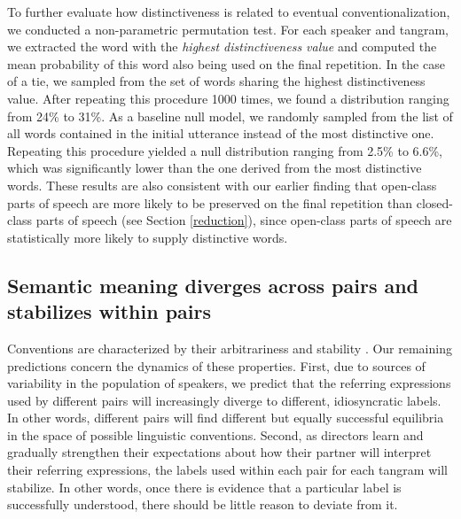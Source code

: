 \documentclass[alpha-refs]{wiley-article}
\begin{document}
To further evaluate how distinctiveness is related to eventual conventionalization, we conducted a non-parametric permutation test.
For each speaker and tangram, we extracted the word with the \emph{highest distinctiveness value} and computed the mean probability of this word also being used on the final repetition. 
In the case of a tie, we sampled from the set of words sharing the highest distinctiveness value.
After repeating this procedure 1000 times, we found a distribution ranging from 24\% to 31\%.
As a baseline null model, we randomly sampled from the list of all words contained in the initial utterance instead of the most distinctive one.
Repeating this procedure yielded a null distribution ranging from 2.5\% to 6.6\%, which was significantly lower than the one derived from the most distinctive words.
These results are also consistent with our earlier finding that open-class parts of speech are more likely to be preserved on the final repetition than closed-class parts of speech (see Section \ref{reduction}), since open-class parts of speech are statistically more likely to supply distinctive words. 

\subsection{Semantic meaning diverges across pairs and stabilizes within pairs}

Conventions are characterized by their arbitrariness and stability \citep{Lewis69_Convention}.
Our remaining predictions concern the dynamics of these properties.
First, due to sources of variability in the population of speakers, we predict that the referring expressions used by different pairs will increasingly diverge to different, idiosyncratic labels.
In other words, different pairs will find different but equally successful equilibria in the space of possible linguistic conventions.
Second, as directors learn and gradually strengthen their expectations about how their partner will interpret their referring expressions, the labels used within each pair for each tangram will stabilize.
In other words, once there is evidence that a particular label is successfully understood, there should be little reason to deviate from it.
\end{document}
